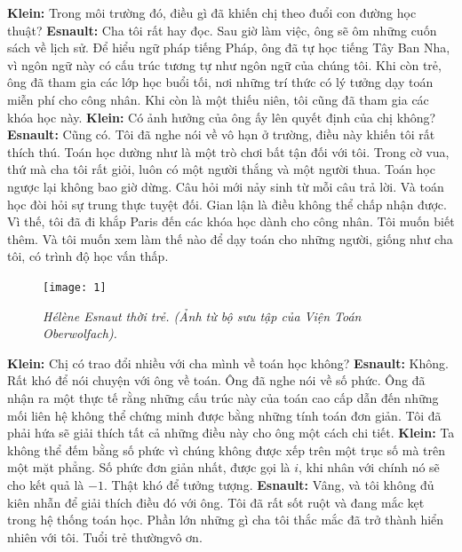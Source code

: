 \begin{multicols}{2}
	\vskip 0.1cm
	\textbf{\color{doithoaitoanhoc}Klein:} Trong môi trường đó, điều gì đã khiến chị theo đuổi con đường học thuật?  
	\vskip 0.1cm
	\textbf{\color{doithoaitoanhoc}Esnault:} Cha tôi rất hay đọc. Sau giờ làm việc, ông sẽ ôm những cuốn sách về lịch sử. Để hiểu ngữ pháp tiếng Pháp, ông đã tự học tiếng Tây Ban Nha, vì ngôn ngữ này có cấu trúc tương tự như ngôn ngữ của chúng tôi. Khi còn trẻ, ông đã tham gia các lớp học buổi tối, nơi những trí thức có lý tưởng dạy toán miễn phí cho công nhân. Khi còn là một thiếu niên, tôi cũng đã tham gia các khóa học này.
	\vskip 0.1cm
	\textbf{\color{doithoaitoanhoc}Klein:} Có ảnh hưởng của ông ấy lên quyết định của chị không?
	\vskip 0.1cm
	\textbf{\color{doithoaitoanhoc}Esnault:} Cũng có. Tôi đã nghe nói về vô hạn ở trường, điều này khiến tôi rất thích thú. Toán học dường như là một trò chơi bất tận đối với tôi. Trong cờ vua, thứ mà cha tôi rất giỏi, luôn có một người thắng và một người thua. Toán học ngược lại không bao giờ dừng. Câu hỏi mới nảy sinh từ mỗi câu trả lời. Và toán học đòi hỏi sự trung thực tuyệt đối. Gian lận là điều không thể chấp nhận được. Vì thế, tôi đã đi khắp Paris đến các khóa học dành cho công nhân. Tôi muốn biết thêm. Và tôi muốn xem làm thế nào để dạy toán cho những người, giống như cha tôi, có trình độ học vấn thấp.
	\begin{figure}[H]
		\centering
		\vspace*{-5pt}
		\captionsetup{labelformat= empty, justification=centering}
		\texttt{[image: 1]}
		\caption{\small\textit{\color{doithoaitoanhoc}Hélène Esnaut thời trẻ. (Ảnh từ bộ sưu tập của Viện Toán Oberwolfach).}}
		\vspace*{-10pt}
	\end{figure}
	\textbf{\color{doithoaitoanhoc}Klein:} Chị có trao đổi nhiều với cha mình về toán học không?
	\vskip 0.1cm
	\textbf{\color{doithoaitoanhoc}Esnault:} Không. Rất khó để nói chuyện với ông về toán. Ông đã nghe nói về số phức. Ông đã nhận ra một thực tế rằng những cấu trúc này của toán cao cấp dẫn đến những mối liên hệ không thể chứng minh được bằng những tính toán đơn giản. Tôi đã phải hứa sẽ giải thích tất cả những điều này cho ông một cách chi tiết.
	\vskip 0.1cm
	\textbf{\color{doithoaitoanhoc}Klein:} Ta không thể đếm bằng số phức vì chúng không được xếp trên một trục số mà trên một mặt phẳng. Số phức đơn giản nhất, được gọi là $i$, khi nhân với chính nó sẽ cho kết quả là $-1$. Thật khó để tưởng tượng.
	\vskip 0.1cm
	\textbf{\color{doithoaitoanhoc}Esnault:} Vâng, và tôi không đủ kiên nhẫn để giải thích điều đó với ông. Tôi đã rất sốt ruột và đang mắc kẹt trong hệ thống toán học. Phần lớn những gì cha tôi thắc mắc đã trở thành hiển nhiên với tôi. Tuổi trẻ thường\linebreak vô ơn.

\end{multicols}
